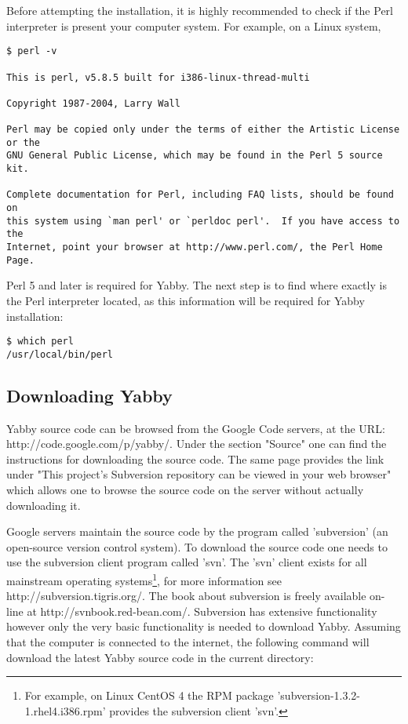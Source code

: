 Before attempting the installation, it is highly recommended to
check if the Perl interpreter is present your computer system.
For example, on a Linux system,

\begin{verbatim}
$ perl -v

This is perl, v5.8.5 built for i386-linux-thread-multi

Copyright 1987-2004, Larry Wall

Perl may be copied only under the terms of either the Artistic License or the
GNU General Public License, which may be found in the Perl 5 source kit.

Complete documentation for Perl, including FAQ lists, should be found on
this system using `man perl' or `perldoc perl'.  If you have access to the
Internet, point your browser at http://www.perl.com/, the Perl Home Page.
\end{verbatim}

Perl 5 and later is required for Yabby.  The next step is to find where
exactly is the Perl interpreter located, as this information will be
required for Yabby installation:

\begin{verbatim}
$ which perl
/usr/local/bin/perl
\end{verbatim}

\subsection{Downloading Yabby}

Yabby source code can be browsed from the Google Code servers, at
the URL: http://code.google.com/p/yabby/. Under the
section "Source" one can find the instructions for downloading the
source code. The same page provides the link under "This project's
Subversion repository can be viewed in your web browser" which allows
one to browse the source code on the server without actually
downloading it.

Google servers maintain the source code by the program called 'subversion'
(an open-source version control system).  To download the source code
one needs to use the subversion client program called 'svn'.  The 'svn'
client exists for all mainstream operating systems\footnote{For example,
on Linux CentOS 4 the RPM package 'subversion-1.3.2-1.rhel4.i386.rpm'
provides the subversion client 'svn'.}, for more information see
http://subversion.tigris.org/.  The book about subversion is freely
available on-line at http://svnbook.red-bean.com/. Subversion has
extensive functionality however only the very basic functionality
is needed to download Yabby.  Assuming that the computer is connected
to the internet, the following command will download the latest Yabby 
source code in the current directory:

